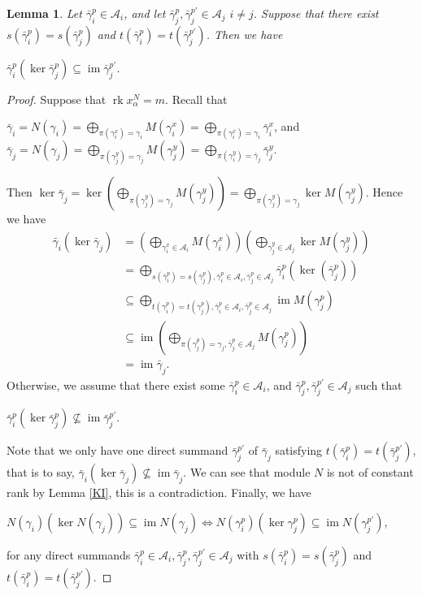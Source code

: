 \documentclass[a4paper,12pt]{amsart}
\newcommand{\cA}{\mathcal{A}}
\newcommand{\bg}{\bar{\gamma}}
\DeclareMathOperator{\rk}{rk}
\DeclareMathOperator{\im}{im}
\newtheorem{Lemma}[proposition]{Lemma}
\begin{document}
\begin{Lemma}\label{tt}
Let $\bg^p_i\in \cA_i$, and let $\bg^{p}_j,\bg^{p'}_j\in \cA_j$ $i\neq j$. Suppose that there exist   $s(\bg^p_i)=s(\bg^p_j)$ and $t(\bg^p_i)=t(\bg^{p'}_j)$. Then we have 
\begin{center}
$\bg^p_i(\ker \bg^{p}_j)\subseteq \im \bg^{p'}_j$.
\end{center}

\end{Lemma}

\begin{proof}
Suppose that $\rk x^N_\alpha =m$.  Recall that
\begin{center}
$\bg_i=N(\gamma_i)=\bigoplus _{\pi(\gamma^x_i)=\gamma_i} M(\gamma^x_i)=\bigoplus _{\pi(\gamma^x_i)=\gamma_i}\bg^x_i$, and $\bg_j=N(\gamma_j)=\bigoplus _{\pi(\gamma^y_j)=\gamma_j} M(\gamma^y_j)=\bigoplus _{\pi(\gamma^y_i)=\bg_j}\bg^y_j $. 
\end{center}
Then $\ker \bg_j=\ker (\bigoplus _{\pi(\gamma^y_j)=\gamma_j}M(\gamma^y_j))=\bigoplus _{\pi(\gamma^y_j)=\gamma_j}\ker M(\gamma^y_j)$. Hence we have 
\begin{equation}
\begin{split}
\bg_i(\ker \bg_j)& =( \bigoplus _{\gamma^x_i\in \cA_i} M(\gamma^x_i))(\bigoplus _{\gamma^y_j\in \cA_j}\ker M(\gamma^y_j)) \\& = \bigoplus_{s(\bg^p_i)=s(\bg^{p}_j), \bg^p_i\in \cA_i,\bg^p_j\in\cA_j}\bg^p_i(\ker (\bg^{p}_j)) \\ &  \subseteq \bigoplus _{t(\gamma^p_i)=t(\gamma^p_j), \bg^p_i\in \cA_i,\bg^p_j\in\cA_j} \im M(\gamma^p_j) \\ & \subseteq\im (\bigoplus _{\pi(\gamma^p_j)=\gamma_j, \bg^p_j\in \cA_j} M(\gamma^p_j)) \\& = \im \bg_j.
\end{split}
\end{equation}
Otherwise, we assume that there exist some $\bg^p_i \in \cA_i$, and $\bg^{p}_j,\bg^{p'}_j\in \cA_j$ such that 
\begin{center}
$\bg^p_i(\ker \bg^{p}_j)\nsubseteq \im \bg^{p'}_j$.
\end{center}
Note that we only have one direct summand $\bg^{p'}_j$ of $\bg_j$ satisfying $t(\bg^p_i)=t(\bg^{p'}_j)$,  that is to say, $\bg_i(\ker \bg_j)\nsubseteq\im \bg_j$. We can see that module $N$ is not of constant   rank by Lemma \ref{KI}, this is a contradiction. Finally, we have 
\begin{center}
 $N(\gamma_i)(\ker N(\gamma_j))\subseteq \im N(\gamma_j) \Leftrightarrow N(\gamma^p_i)(\ker \gamma^{p}_j)\subseteq \im N(\gamma^{p'}_j)$, 
\end{center}
for any direct summands $\bg^p_i\in \cA_i, \bg^p_j,\bg^{p'}_j\in \cA_j$ with $s(\bg^p_i)=s(\bg^{p}_j)$ and $t(\bg^p_i)=t(\bg^{p'}_j)$.

\end{proof}
\end{document}
